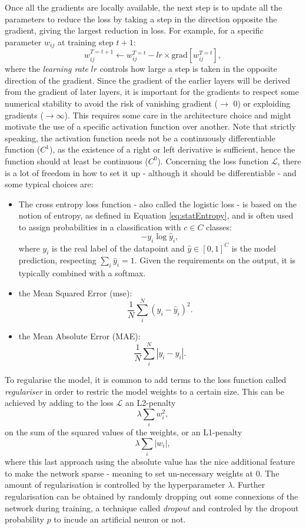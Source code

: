 Once all the gradients are locally available, the next step is to update all the parameters to reduce the loss by taking a step in the direction opposite the gradient, giving the largest reduction in loss. For example, for a specific parameter $w_{ij}$ at training step $t+1$:
\begin{equation}\label{eq:gradientdescent}
    w^{T=t+1}_{ij} \leftarrow w^{T=t}_{ij} - lr \times \text{grad}\left[w^{T=t}_{ij}\right],
\end{equation}
where the \textit{learning rate} $lr$ controls how large a step is taken in the opposite direction of the gradient. Since the gradient of the earlier layers will be derived from the gradient of later layers, it is important for the gradients to respect some numerical stability to avoid the risk of vanishing gradient ($\rightarrow$ 0) or exploiding gradients ($\rightarrow \infty$). This requires some care in the architecture choice and might motivate the use of a specific activation function over another. Note that strictly speaking, the activation function needs not be a continuously differentiable function ($C^1$), as the existence of a right or left derivative is sufficient, hence the function should at least be continuous ($C^0$). Concerning the loss function $\mathcal{L}$, there is a lot of freedom in how to set it up - although it should be differentiable - and some typical choices are:
\begin{itemize}
    \item The cross entropy loss function - also called the logistic loss - is based on the notion of entropy, as defined in Equation \ref{eq:statEntropy}, and is often used to assign probabilities in a classification with $c \in C$ classes: \[ -y_i \log\hat{y}_i,\] where $y_i$ is the real label of the datapoint and $\hat{y} \in [0, 1]^C$ is the model prediction, respecting $\sum_i \hat{y}_i = 1$. Given the requirements on the output, it is typically combined with a softmax. 
    \item the Mean Squared Error (\gls{mse}): \[\frac{1}{N}\sum_i^N (y_i - \hat{y}_i)^2.\] 
    \item the Mean Absolute Error (MAE): \[\frac{1}{N}\sum_i^N |y_i - \hat{y}_i|.\]
\end{itemize} 
To regularise the model, it is common to add terms to the loss function called \textit{regulariser} in order to restric the model weights to a certain size. This can be achieved by adding to the loss $\mathcal{L}$ an L2-penalty \[\lambda \sum_i w_i^2,\] on the sum of the squared values of the weights, or an L1-penalty \[\lambda \sum_i |w_i|,\] where this last approach using the absolute value has the nice additional feature to make the network sparse - meaning to set un-necessary weights at 0. The amount of regularisation is controlled by the hyperparameter $\lambda$. Further regularisation can be obtained by randomly dropping out some connexions of the network during training, a technique called \textit{dropout} and controled by the dropout probability $p$ to incude an artificial neuron or not.

